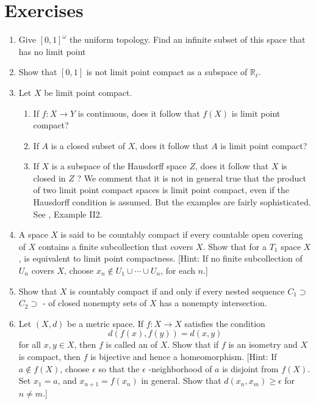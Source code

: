 \section*{Exercises}
\begin{enumerate}[itemsep=0.4em, parsep=0pt, topsep=0pt, partopsep=0pt, leftmargin=*, label=\arabic*., ref=\arabic*]
\item Give \({[ 0,1] }^{\omega }\) the uniform topology. Find an infinite subset of this space that has no limit point
\item Show that \([ {0,1}]\) is not limit point compact as a subspace of \(\mathbb{R}_{\ell }\).
\item Let \(X\) be limit point compact.
 \begin{enumerate}[itemsep=0.2em, parsep=0pt, topsep=0pt, partopsep=0pt, leftmargin=*, label=(\alph*), align=left]
 \item If \(f : X \rightarrow Y\) is continuous, does it follow that \(f( X)\) is limit point compact?
 \item If \(A\) is a closed subset of \(X\), does it follow that \(A\) is limit point compact?
 \item If \(X\) is a subspace of the Hausdorff space \(Z\), does it follow that \(X\) is closed in \(Z\) ? We comment that it is not in general true that the product of two limit point compact spaces is limit point compact, even if the Hausdorff condition is assumed. But the examples are fairly sophisticated. See \cite{SteenSeebach1970}, Example II2.
 \end{enumerate}
\item A space \(X\) is said to be countably compact if every countable open covering of \(X\) contains a finite subcollection that covers \(X\). Show that for a \(T_{1}\) space \(X\),  is equivalent to limit point compactness. [Hint: If no finite subcollection of \(U_{n}\) covers \(X\), choose \(x_{n} \notin {U}_{1} \cup \cdots \cup {U}_{n}\), for each \(n\).]
\item Show that \(X\) is countably compact if and only if every nested sequence \(C_{1} \supset\) \(C_{2} \supset\) - of closed nonempty sets of \(X\) has a nonempty intersection.
\item Let \((X, d)\) be a metric space. If \(f : X \rightarrow X\) satisfies the condition \[ d( {f(x),f( y) }) = d( {x,y}) \] for all \(x,y \in X\), then \(f\) is called an  of \(X\). Show that if \(f\) is an isometry and \(X\) is compact, then \(f\) is bijective and hence a homeomorphism. [Hint: If \(a \notin f( X)\), choose \(\epsilon\) so that the \(\epsilon\) -neighborhood of \(a\) is disjoint from \(f( X)\). Set \(x_{1} = a\), and \(x_{n + 1} = f( x_{n})\) in general. Show that \(d( {x_{n},x_{m}}) \geq \epsilon\) for \(n \neq m\).]

\end{enumerate}
